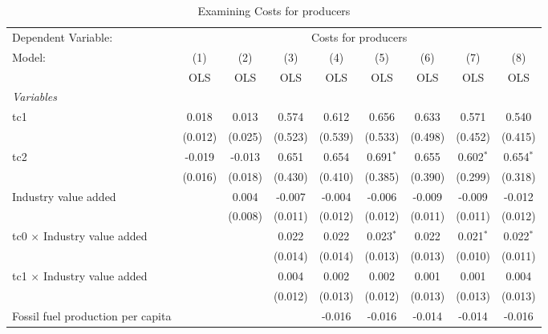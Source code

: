 
\begin{table}[htbp]
   \caption{Examining Costs for producers}
   \centering
   \begin{tabular}{lcccccccc}
      \toprule
      Dependent Variable: & \multicolumn{8}{c}{Costs for producers}\\
      Model:                                  & (1)     & (2)     & (3)     & (4)     & (5)         & (6)     & (7)         & (8)\\  
                                              &  OLS    & OLS     & OLS     & OLS     & OLS         & OLS     & OLS         & OLS\\  
      \midrule
      \emph{Variables}\\
      tc1                                     & 0.018   & 0.013   & 0.574   & 0.612   & 0.656       & 0.633   & 0.571       & 0.540\\   
                                              & (0.012) & (0.025) & (0.523) & (0.539) & (0.533)     & (0.498) & (0.452)     & (0.415)\\   
      tc2                                     & -0.019  & -0.013  & 0.651   & 0.654   & 0.691$^{*}$ & 0.655   & 0.602$^{*}$ & 0.654$^{*}$\\   
                                              & (0.016) & (0.018) & (0.430) & (0.410) & (0.385)     & (0.390) & (0.299)     & (0.318)\\   
      Industry value added                    &         & 0.004   & -0.007  & -0.004  & -0.006      & -0.009  & -0.009      & -0.012\\   
                                              &         & (0.008) & (0.011) & (0.012) & (0.012)     & (0.011) & (0.011)     & (0.012)\\   
      tc0 $\times$ Industry value added       &         &         & 0.022   & 0.022   & 0.023$^{*}$ & 0.022   & 0.021$^{*}$ & 0.022$^{*}$\\   
                                              &         &         & (0.014) & (0.014) & (0.013)     & (0.013) & (0.010)     & (0.011)\\   
      tc1 $\times$ Industry value added       &         &         & 0.004   & 0.002   & 0.002       & 0.001   & 0.001       & 0.004\\   
                                              &         &         & (0.012) & (0.013) & (0.012)     & (0.013) & (0.013)     & (0.013)\\   
      Fossil fuel production per capita       &         &         &         & -0.016  & -0.016      & -0.014  & -0.014      & -0.016\\   

\end{tabular}
\end{table}
